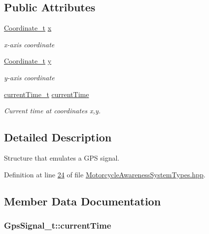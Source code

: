 \subsection*{Public Attributes}
\begin{DoxyCompactItemize}
\item 
\hyperlink{MotorcycleAwarenessSystemTypes_8hpp_ae989615510617e9b0ad39dcd343c78fb}{Coordinate\-\_\-t} \hyperlink{structGpsSignal__t_a6f7bd3c500b55923ab335ada4b6b26eb}{x}
\begin{DoxyCompactList}\small\item\em x-\/axis coordinate \end{DoxyCompactList}\item 
\hyperlink{MotorcycleAwarenessSystemTypes_8hpp_ae989615510617e9b0ad39dcd343c78fb}{Coordinate\-\_\-t} \hyperlink{structGpsSignal__t_ab9e083be189fc842ed7aa4fdc978e94e}{y}
\begin{DoxyCompactList}\small\item\em y-\/axis coordinate \end{DoxyCompactList}\item 
\hyperlink{MotorcycleAwarenessSystemTypes_8hpp_a75ae168a2dad22557428f696df806a76}{current\-Time\-\_\-t} \hyperlink{structGpsSignal__t_abc96245129f39c6e51e8bfe955f2047e}{current\-Time}
\begin{DoxyCompactList}\small\item\em Current time at coordinates x,y. \end{DoxyCompactList}\end{DoxyCompactItemize}


\subsection{Detailed Description}
Structure that emulates a G\-P\-S signal. 

Definition at line \hyperlink{MotorcycleAwarenessSystemTypes_8hpp_source_l00024}{24} of file \hyperlink{MotorcycleAwarenessSystemTypes_8hpp_source}{Motorcycle\-Awareness\-System\-Types.\-hpp}.



\subsection{Member Data Documentation}
\hypertarget{structGpsSignal__t_abc96245129f39c6e51e8bfe955f2047e}{
\subsubsection[{current\-Time}]{ Gps\-Signal\-\_\-t\-::current\-Time}}\label{structGpsSignal__t_abc96245129f39c6e51e8bfe955f2047e}


